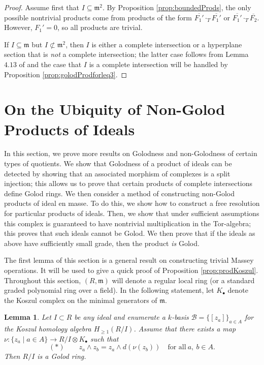 \documentclass[10pt]{amsart}
\newtheorem{lemma}[theorem]{Lemma}
\theoremstyle{definition}
\theoremstyle{remark}
\newtheorem{the context}[theorem]{The Context}
\numberwithin{equation}{theorem}
\numberwithin{equation}{section}
\newcommand{\cat}[1]{\mathcal{#1}}
\newcommand{\ideal}[1]{\mathfrak{#1}}
\newcommand{\m}{\ideal{m}}
\renewcommand{\geq}{\geqslant}
\def\w{\wedge}
\begin{document}
\begin{proof}
Assume first that $I \subseteq \m^2$. By Proposition \ref{prop:boundedProds}, the only possible nontrivial products come from products of the form $\overline{F_1'} \cdot_T \overline{F_1'}$ or $\overline{F_1'} \cdot_T \overline{F_2}$. However, $F_1' = 0$, so all products are trivial.

If $I \subseteq \m$ but $I \not\subset \m^2$, then $I$ is either a complete intersection or a hyperplane section that is \emph{not} a complete intersection; the latter case follows from Lemma $4.13$ of \cite{vandebogert2020dg} and the case that $I$ is a complete intersection will be handled by Proposition \ref{prop:golodProdforleq3}.
\end{proof}

\section{On the Ubiquity of Non-Golod Products of Ideals}\label{sec:nonGolodProds}

In this section, we prove more results on Golodness and non-Golodness of certain types of quotients. We show that Golodness of a product of ideals can be detected by showing that an associated morphism of complexes is a split injection; this allows us to prove that certain products of complete intersections define Golod rings. We then consider a method of constructing non-Golod products of ideal en masse. To do this, we show how to construct a free resolution for particular products of ideals. Then, we show that under sufficient assumptions this complex is guaranteed to have nontrivial multiplication in the Tor-algebra; this proves that such ideals cannot be Golod. We then prove that if the ideals as above have sufficiently small grade, then the product \emph{is} Golod. 

The first lemma of this section is a general result on constructing trivial Massey operations. It will be used to give a quick proof of Proposition \ref{prop:prodKoszul}. Throughout this section, $(R , \m)$ will denote a regular local ring (or a standard graded polynomial ring over a field). In the following statement, let $K_\bullet$ denote the Koszul complex on the minimal generators of $\m$.


\begin{lemma}\label{lem:golodnessLem}
Let $I \subset R$ be any ideal and enumerate a $k$-basis $\cat{B} = \{ [z_a ] \}_{a \in A}$ for the Koszul homology algebra $H_{\geq 1} (R/I)$. Assume that there exists a map $\nu : \{ z_a \mid a \in A \} \to R/I \otimes K_\bullet$ such that
$$(*) \qquad z_a \w z_b = z_a \w d( \nu (z_b)) \quad \textrm{for all} \ a,  \ b \in A.$$
Then $R/I$ is a Golod ring.
\end{lemma}
\end{document}
